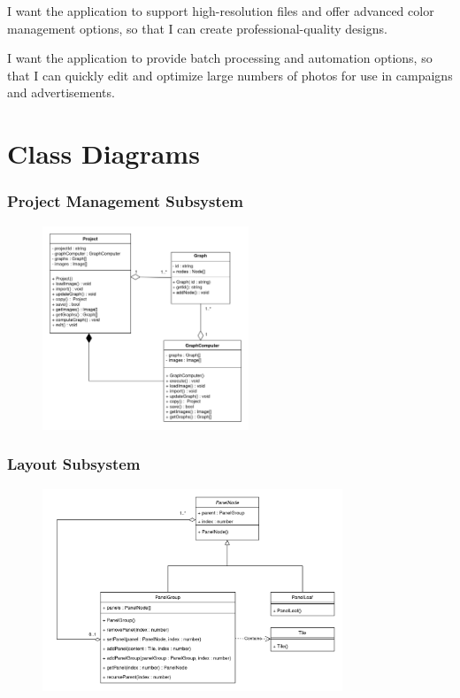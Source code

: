 \documentclass[11pt,a4paper]{article}
\begin{document}
I want the application to support high-resolution files and offer advanced color
management options, so that I can create professional-quality designs.

I want the application to provide batch processing and automation options, so
that I can quickly edit and optimize large numbers of photos for use in
campaigns and advertisements.

\pagebreak

\section*{Class Diagrams}

\subsubsection*{Project Management Subsystem}
\begin{figure}[htbp]
    \centering
    \href{https://drive.google.com/drive/u/2/folders/1rnYMSGTOmKY8_pOyJUIacjTxuubO_6NX}
    {\includegraphics[width=0.55\textwidth]{../diagramPng/Project-subsystem.png}}
\end{figure}

\subsubsection*{Layout Subsystem}
\begin{figure}[htbp]
    \centering
      \href{https://drive.google.com/drive/u/2/folders/1rnYMSGTOmKY8_pOyJUIacjTxuubO_6NX}
      {\includegraphics[width=0.8\textwidth]{../diagramPng/Layout-Subsystem.png}}
\end{figure}
\end{document}
